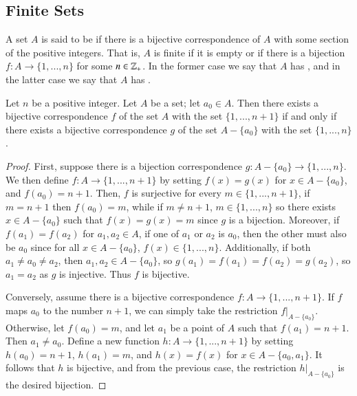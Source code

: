 \documentclass[12pt, a4paper, oneside, openright, titlepage]{book}
\begin{document}
\begin{appendices}
    \section{Finite Sets}

    \begin{defn}
        A set $A$ is said to be  if there is a bijective correspondence of $A$ with some section of the positive integers. That is, $A$ is finite if it is empty or if there is a bijection $f:A\rightarrow \{1,...,n\}$ for some $n \in \mathbb Z_+$. In the former case we say that $A$ has , and in the latter case we say that $A$ has .
    \end{defn}

    \begin{lem}
        Let $n$ be a positive integer. Let $A$ be a set; let $a_0 \in A$. Then there exists a bijective correspondence $f$ of the set $A$ with the set $\{1,...,n+1\}$ if and only if there exists a bijective correspondence $g$ of the set $A-\{a_0\}$ with the set $\{1,...,n\}$.
    \end{lem}
    \begin{proof}
        First, suppose there is a bijection correspondence $g:A-\{a_0\}\rightarrow \{1,...,n\}$. We then define $f:A\rightarrow \{1,...,n+1\}$ by setting $f(x) = g(x)$ for $x \in A-\{a_0\}$, and $f(a_0) = n+1$. Then, $f$ is surjective for every $m \in \{1,...,n+1\}$, if $m = n+1$ then $f(a_0) = m$, while if $m \neq n+1$, $m \in \{1,...,n\}$ so there exists $x \in A-\{a_0\}$ such that $f(x) = g(x) = m$ since $g$ is a bijection. Moreover, if $f(a_1) = f(a_2)$ for $a_1,a_2 \in A$, if one of $a_1$ or $a_2$ is $a_0$, then the other must also be $a_0$ since for all $x \in A-\{a_0\}$, $f(x) \in \{1,...,n\}$. Additionally, if both $a_1 \neq a_0 \neq a_2$, then $a_1,a_2 \in A-\{a_0\}$, so $g(a_1) = f(a_1) = f(a_2) = g(a_2)$, so $a_1 = a_2$ as $g$ is injective. Thus $f$ is bijective. 

        Conversely, assume there is a bijective correspondence $f:A\rightarrow \{1,...,n+1\}$. If $f$ maps $a_0$ to the number $n+1$, we can simply take the restriction $f\rvert_{A-\{a_0\}}$. Otherwise, let $f(a_0) = m$, and let $a_1$ be a point of $A$ such that $f(a_1) = n+1$. Then $a_1 \neq a_0$. Define a new function $h:A\rightarrow \{1,...,n+1\}$ by setting $h(a_0) = n+1$, $h(a_1) = m$, and $h(x) = f(x)$ for $x \in A-\{a_0,a_1\}$. It follows that $h$ is bijective, and from the previous case, the restriction $h\rvert_{A-\{a_0\}}$ is the desired bijection.
    \end{proof}



\end{appendices}
\end{document}
